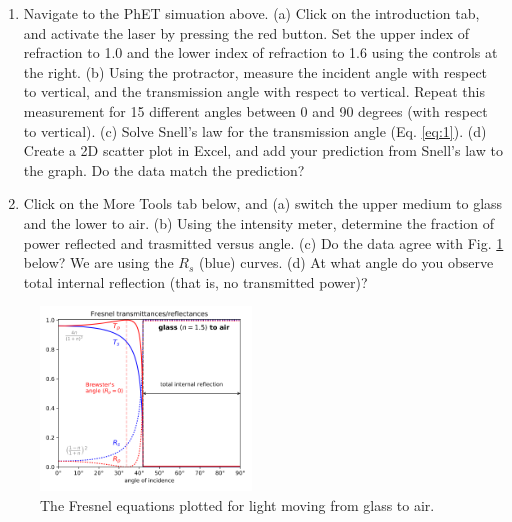\documentclass{article}
\begin{document}
\begin{enumerate}
\item Navigate to the PhET simuation above.  (a) Click on the introduction tab, and activate the laser by pressing the red button. Set the upper index of refraction to 1.0 and the lower index of refraction to 1.6 using the controls at the right.  (b) Using the protractor, measure the incident angle with respect to vertical, and the transmission angle with respect to vertical.  Repeat this measurement for 15 different angles between 0 and 90 degrees (with respect to vertical).  (c) Solve Snell's law for the transmission angle (Eq. \ref{eq:1}). (d) Create a 2D scatter plot in Excel, and add your prediction from Snell's law to the graph.  Do the data match the prediction?
\clearpage
\item Click on the More Tools tab below, and (a) switch the upper medium to glass and the lower to air.  (b) Using the intensity meter, determine the fraction of power reflected and trasmitted versus angle. (c) Do the data agree with Fig. \ref{fig:1} below?  We are using the $R_s$ (blue) curves. (d) At what angle do you observe total internal reflection (that is, no transmitted power)?
\end{enumerate}

\begin{figure}
\centering
\includegraphics[width=0.5\textwidth]{figures/fresnel.png}
\caption{\label{fig:1} The Fresnel equations plotted for light moving from glass to air.}
\end{figure}
\end{document}
